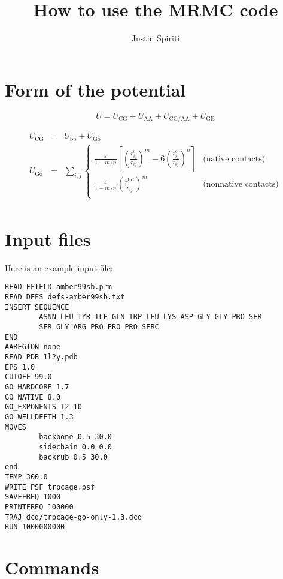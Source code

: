 \documentclass{article}      %
\title{How to use the MRMC code}  %
\author{Justin Spiriti}      %
\begin{document}

\maketitle                   %

\section{Form of the potential}

\begin{equation}
U = U_\mathrm{CG} + U_\mathrm{AA} + U_\mathrm{CG/AA} + U_\mathrm{GB}
\end{equation}

\begin{eqnarray}
U_\mathrm{CG} &=& U_\mathrm{bb} + U_\mathrm{G\overline{o}} \\
U_\mathrm{G\overline{o}} &=& \sum_{i,j} \left\{ 
\begin{array}{ll}
\frac{\varepsilon}{1-m/n} \left[\left(\frac{r^0_{ij}}{r_{ij}}\right)^{m}-6\left(\frac{r^0_{ij}}{r_{ij}}\right)^{n}\right] & \textrm{(native contacts)} \\
\frac{\varepsilon}{1-m/n} \left(\frac{r^\mathrm{HC}}{r_{ij}}\right)^{m}& \textrm{(nonnative contacts)} \\
\end{array}
\right. \\ 
\end{eqnarray}

\section{Input files}
Here is an example input file:
\begin{verbatim}
READ FFIELD amber99sb.prm
READ DEFS defs-amber99sb.txt
INSERT SEQUENCE
        ASNN LEU TYR ILE GLN TRP LEU LYS ASP GLY GLY PRO SER
        SER GLY ARG PRO PRO PRO SERC
END
AAREGION none
READ PDB 1l2y.pdb
EPS 1.0
CUTOFF 99.0
GO_HARDCORE 1.7
GO_NATIVE 8.0
GO_EXPONENTS 12 10
GO_WELLDEPTH 1.3
MOVES
        backbone 0.5 30.0
        sidechain 0.0 0.0
        backrub 0.5 30.0
end
TEMP 300.0
WRITE PSF trpcage.psf
SAVEFREQ 1000
PRINTFREQ 100000
TRAJ dcd/trpcage-go-only-1.3.dcd
RUN 1000000000
\end{verbatim}

\section{Commands}
\end{document}
